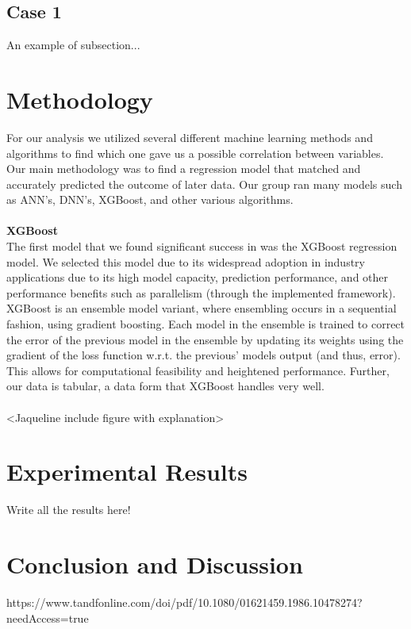 \documentclass[10pt]{article}
\begin{document}
\subsection{Case 1}
An example of subsection...

\section{Methodology}\label{sec:4}
For our analysis we utilized several different machine learning methods and algorithms to find which one gave us a possible correlation between variables. Our main methodology was to find a regression model that matched and accurately predicted the outcome of later data. Our group ran many models such as ANN’s, DNN’s, XGBoost, and other various algorithms. 
\\
\\
\textbf{XGBoost}\\
The first model that we found significant success in was the XGBoost regression model. We selected this model due to its widespread adoption in industry applications due to its high model capacity, prediction performance, and other performance benefits such as parallelism (through the implemented framework).  XGBoost is an ensemble model variant, where ensembling occurs in a sequential fashion, using gradient boosting.  Each model in the ensemble is trained to correct the error of the previous model in the ensemble by updating its weights using the gradient of the loss function w.r.t. the previous’ models output (and thus, error).  This allows for computational feasibility and heightened performance.  Further, our data is tabular, a data form that XGBoost handles very well.
\\
\\
<Jaqueline include figure with explanation>

\newpage

\section{Experimental Results}\label{sec:5}

Write all the results here!

\section{Conclusion and Discussion}\label{sec:6}



 
 
https://www.tandfonline.com/doi/pdf/10.1080/01621459.1986.10478274?needAccess=true
\end{document}
